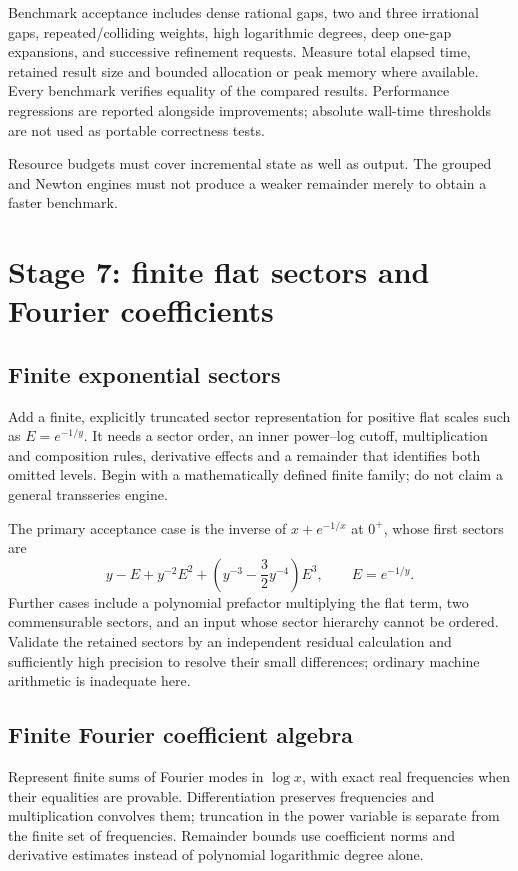 \documentclass[11pt,a4paper]{article}
\begin{document}
Benchmark acceptance includes dense rational gaps, two and three irrational gaps, repeated/colliding weights, high logarithmic degrees, deep one-gap expansions, and successive refinement requests. Measure total elapsed time, retained result size and bounded allocation or peak memory where available. Every benchmark verifies equality of the compared results. Performance regressions are reported alongside improvements; absolute wall-time thresholds are not used as portable correctness tests.

Resource budgets must cover incremental state as well as output. The grouped and Newton engines must not produce a weaker remainder merely to obtain a faster benchmark.

\section{Stage 7: finite flat sectors and Fourier coefficients}

\subsection{Finite exponential sectors}

Add a finite, explicitly truncated sector representation for positive flat scales such as $E=e^{-1/y}$. It needs a sector order, an inner power--log cutoff, multiplication and composition rules, derivative effects and a remainder that identifies both omitted levels. Begin with a mathematically defined finite family; do not claim a general transseries engine.

The primary acceptance case is the inverse of $x+e^{-1/x}$ at $0^+$, whose first sectors are
\[
 y-E+y^{-2}E^2+
 \left(y^{-3}-\frac32y^{-4}\right)E^3,\qquad E=e^{-1/y}.
\]
Further cases include a polynomial prefactor multiplying the flat term, two commensurable sectors, and an input whose sector hierarchy cannot be ordered. Validate the retained sectors by an independent residual calculation and sufficiently high precision to resolve their small differences; ordinary machine arithmetic is inadequate here.

\subsection{Finite Fourier coefficient algebra}

Represent finite sums of Fourier modes in $\log x$, with exact real frequencies when their equalities are provable. Differentiation preserves frequencies and multiplication convolves them; truncation in the power variable is separate from the finite set of frequencies. Remainder bounds use coefficient norms and derivative estimates instead of polynomial logarithmic degree alone.
\end{document}
